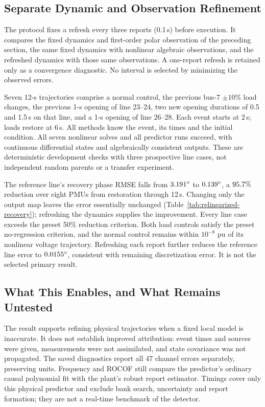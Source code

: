 \subsection{Separate Dynamic and Observation Refinement}
The protocol fixes a refresh every three reports (0.1\,s) before execution.
It compares the fixed dynamics and first-order polar observation of the
preceding section, the same fixed dynamics with nonlinear algebraic
observations, and the refreshed dynamics with those same observations.
A one-report refresh is retained only as a convergence diagnostic.
No interval is selected by minimizing the observed errors.

Seven 12-s trajectories comprise a normal control, the previous bus-7
$\pm10\%$ load changes, the previous 1-s opening of line 23--24, two new
opening durations of 0.5 and 1.5\,s on that line, and a 1-s opening of line
26--28. Each event starts at 2\,s; loads restore at 6\,s. All methods know
the event, its times and the initial condition. All seven nonlinear solves
and all predictor runs succeed, with continuous differential states and
algebraically consistent outputs. These are deterministic development
checks with three prospective line cases, not independent random parents
or a transfer experiment.



The reference line's recovery phase RMSE falls from
$3.191{}^\circ$ to $0.139{}^\circ$, a $95.7{}\%$
reduction over eight PMUs from restoration through 12\,s.
Changing only the output map leaves the error essentially unchanged
(Table~\ref{tab:relinearized-recovery}); refreshing the dynamics supplies
the improvement. Every line case exceeds the preset 50\% reduction
criterion. Both load controls satisfy the preset no-regression criterion,
and the normal control remains within $10^{-8}$ pu of its nonlinear
voltage trajectory. Refreshing each report further reduces the reference
line error to $0.0155{}^\circ$, consistent with remaining
discretization error. It is not the selected primary result.



\subsection{What This Enables, and What Remains Untested}
The result supports refining physical trajectories when a fixed local
model is inaccurate. It does not establish improved attribution: event
times and sources were given, measurements were not assimilated, and
state covariance was not propagated. The saved diagnostics report all
47 channel errors separately, preserving units. Frequency and ROCOF
still compare the predictor's ordinary causal polynomial fit with the
plant's robust report estimator. Timings cover only this physical
predictor and exclude bank search, uncertainty and report formation;
they are not a real-time benchmark of the detector.

